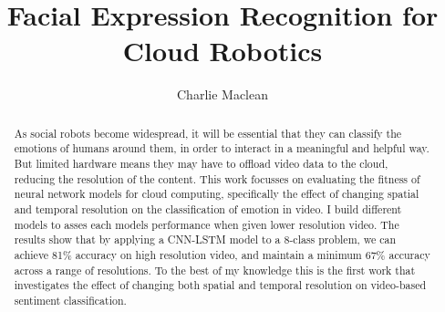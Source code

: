 \documentclass[sigconf]{acmart}
\begin{document}
\title{Facial Expression Recognition for Cloud Robotics}

\author{Charlie Maclean}


\renewcommand{\shortauthors}{Charlie Maclean}

\begin{abstract}

As social robots become widespread, it will be essential that they can
classify the emotions of humans around them, in order to interact in a
meaningful and helpful way. But limited hardware means they
may have to offload video data to the cloud, reducing the resolution of the
content. This work focusses on evaluating the fitness of neural network models
for cloud computing, specifically the effect of changing spatial and temporal 
resolution on the
classification of emotion in video. I build different models to asses each
models performance when given lower resolution video. The results show that by
applying a CNN-LSTM model to a 8-class problem, we can achieve 81\% accuracy on high resolution
video, and maintain a minimum 67\% accuracy across a range of resolutions. To the best of
my knowledge this is the first work that investigates the effect of changing
both spatial and temporal resolution on video-based sentiment classification.

\end{abstract}



\maketitle
\end{document}
